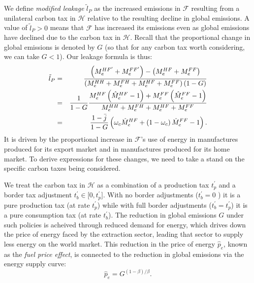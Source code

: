 \documentclass[notitlepage,12pt]{article}
\begin{document}
We define \emph{modified leakage} $\tilde{l}_{P}$ as the increased emissions
in $\mathcal{F}$ resulting from a unilateral carbon tax in $\mathcal{H}$
relative to the resulting decline in global emissions. A value of $\tilde{l}%
_{P}>0$ means that $\mathcal{F}$ has increased its emissions even as global
emissions have declined due to the carbon tax in $\mathcal{H}$. Recall that
the proportional change in global emissions is denoted by $G$ (so that for
any carbon tax worth considering, we can take $G<1$). Our leakage formula is
thus:%
\begin{eqnarray*}
\tilde{l}_{P} &=&\frac{\left( M_{e}^{HF^{\prime }}+M_{e}^{FF^{\prime
}}\right) -\left( M_{e}^{HF}+M_{e}^{FF}\right) }{\left(
M_{e}^{HH}+M_{e}^{FH}+M_{e}^{HF}+M_{e}^{FF}\right) \left( 1-G\right) } \\
&=&\frac{1}{1-G}\frac{M_{e}^{HF}\left( \hat{M}_{e}^{HF}-1\right)
+M_{e}^{FF}\left( \hat{M}_{e}^{FF}-1\right) }{%
M_{e}^{HH}+M_{e}^{FH}+M_{e}^{HF}+M_{e}^{FF}} \\
&=&\frac{1-\bar{j}}{1-G}\left( \omega _{c}\hat{M}_{e}^{HF}+\left( 1-\omega
_{c}\right) \hat{M}_{e}^{FF}-1\right) .
\end{eqnarray*}%
It is driven by the proportional increase in $\mathcal{F}$'s use of energy
in manufactures produced for its export market and in manufactures produced
for its home market. To derive expressions for these changes, we need to
take a stand on the specific carbon taxes being considered.

We treat the carbon tax in $\mathcal{H}$ as a combination of a production
tax $t_{p}^{\prime }$ and a border tax adjustment $t_{b}^{\prime }\in
\lbrack 0,t_{p}^{\prime }]$. With no border adjustments ($t_{b}^{\prime }=0$%
) it is a pure production tax (at rate $t_{p}^{\prime }$) while with full
border adjustments ($t_{b}^{\prime }=t_{p}^{\prime }$) it is a pure
consumption tax (at rate $t_{b}^{\prime }$). The reduction in global
emissions $G$ under such policies is acheived through reduced demand for
energy, which drives down the price of energy faced by the extraction
sector, leading that sector to supply less energy on the world market. This
reduction in the price of energy $\hat{p}_{e}$, known as the \emph{fuel
price effect}, is connected to the reduction in global emissions via the
energy supply curve:%
\begin{equation}
\hat{p}_{e}=G^{(1-\beta )/\beta }.  \label{fuel price effect}
\end{equation}
\end{document}
